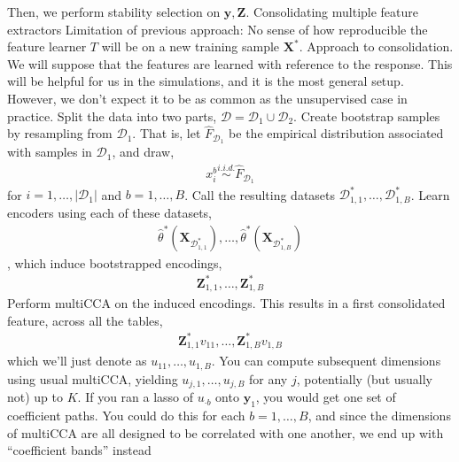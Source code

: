 \documentclass[11pt]{article}
\begin{document}
\begin{outline}
      \4 Then, we perform stability selection on $\mathbf{y}, \mathbf{Z}$.
  \2 Consolidating multiple feature extractors
    \3 Limitation of previous approach: No sense of how reproducible the feature
    learner $T$ will be on a new training sample $\mathbf{X}^{\ast}$.
    \3 Approach to consolidation. We will suppose that the features are learned
    with reference to the response. This will be helpful for us in the
    simulations, and it is the most general setup. However, we don't expect it
    to be as common as the unsupervised case in practice.
      \4 Split the data into two parts, $\mathcal{D} = \mathcal{D}_{1} \cup \mathcal{D}_{2}$.
      \4 Create bootstrap samples by resampling from $\mathcal{D}_{1}$. That is,
      let $\hat{F}_{\mathcal{D}_{1}}$ be the empirical distribution associated
      with samples in $\mathcal{D}_{1}$, and draw,
      \begin{align}
        x_{i}^{b} \overset{i.i.d.}{\sim} \hat{F}_{\mathcal{D}_{1}}
      \end{align}
      for $i = 1, \dots, \left|\mathcal{D}_{1}\right|$ and $b = 1, \dots, B$.
      Call the resulting datasets $\mathcal{D}_{1,1}^{\ast}, \dots,
      \mathcal{D}_{1, B}^{\ast}$.
      \4 Learn encoders using each of these datasets,
      \begin{align}
        \hat{\theta}^{\ast}\left(\mathbf{X}_{\mathcal{D}_{1,1}^{\ast}}\right), \dots, \hat{\theta}^{\ast}\left(\mathbf{X}_{\mathcal{D}_{1,B}^{\ast}}\right)
      \end{align},
      which induce bootstrapped encodings,
      \begin{align}
        \mathbf{Z}_{1,1}^{\ast}, \dots, \mathbf{Z}_{1,B}^{\ast}
      \end{align}
      \4 Perform multiCCA on the induced encodings. This results in a first
      consolidated feature, across all the tables,
      \begin{align}
        \mathbf{Z}_{1,1}^{\ast}v_{11}, \dots, \mathbf{Z}_{1, B}^{\ast}v_{1,B}
      \end{align}
      which we'll just denote as $u_{11}, \dots, u_{1,B}$. You can compute
      subsequent dimensions using usual multiCCA, yielding $u_{j,1}, \dots,
      u_{j,B}$ for any $j$, potentially (but usually not) up to $K$.
      \4 If you ran a lasso of $u_{\cdot b}$ onto $\mathbf{y}_{1}$, you would
      get one set of coefficient paths. You could do this for each $b = 1,
      \dots, B$, and since the dimensions of multiCCA are all designed to be
      correlated with one another, we end up with ``coefficient bands'' instead

\end{outline}
\end{document}
